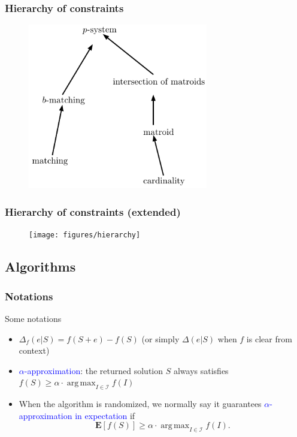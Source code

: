 \documentclass{beamer}
\newcommand{\calI}{\mathcal{I}}
\newcommand{\E}{\mathbf{E}}
\newcommand{\emRed}[1][]{\textcolor{blue} #1}
\DeclareMathOperator*{\argmax}{arg\,max}
\begin{document}
\begin{frame}
  \frametitle{Hierarchy of constraints}
  \begin{figure}[!ht]
    \centering
    \includegraphics[width=0.7\textwidth]{figures/hh}
  \end{figure}
\end{frame}


\begin{frame}
  \frametitle{Hierarchy of constraints (extended)}
  \begin{figure}[!ht]
    \centering
    \texttt{[image: figures/hierarchy]}
  \end{figure}
\end{frame}





\subsection{Algorithms}

\begin{frame}
  \frametitle{Notations}
  \begin{block}{Some notations}
    \begin{itemize}
      \item $\Delta_f(e|S) = f(S + e) - f(S)$ (or simply $\Delta(e|S)$ when $f$ is clear from context)
      \item \emRed{$\alpha$-approximation}: the returned solution $S$ always satisfies  $f(S) \geq \alpha \cdot \argmax_{I\in\calI}f(I)$
      \item When the algorithm is randomized, we normally say it guarantees \emRed{$\alpha$-approximation in expectation} if $$\E[f(S)] \geq \alpha\cdot \argmax_{I\in\calI}f(I).$$ 
    \end{itemize}
  \end{block}
\end{frame}
\end{document}
